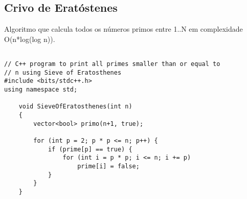 \subsection{Crivo de Eratóstenes}
Algoritmo que calcula todos os números primos entre 1..N em complexidade \\
 O(n*log(log n)).
\begin{verbatim}
    
// C++ program to print all primes smaller than or equal to
// n using Sieve of Eratosthenes
#include <bits/stdc++.h>
using namespace std;
 
    void SieveOfEratosthenes(int n)
    {
        vector<bool> primo(n+1, true);
    
        for (int p = 2; p * p <= n; p++) {
            if (prime[p] == true) {
                for (int i = p * p; i <= n; i += p)
                    prime[i] = false;
            }
        }
    }
\end{verbatim}



\pagebreak
